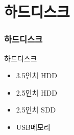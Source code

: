 \documentclass[aspectratio=1610,20pt,xcolor=pdftex,dvipsnames,table,handout]{beamer}
\begin{document}
%
%
%
%	
%
%
%

		\section{하드디스크 }

		\begin{frame} [t,plain]
		\frametitle 	{하드디스크}
		\end{frame}						

		\begin{frame} [t,plain]
			\begin{block} {하드디스크 }
			\setlength{\leftmargini}{2em}			
			\begin{itemize}
				\item 3.5인치 HDD
				\item 2.5인치 HDD
				\item 2.5인치 SDD
				\item USB메모리
			\end{itemize}
			\end{block}						
		\end{frame}						
\end{document}

